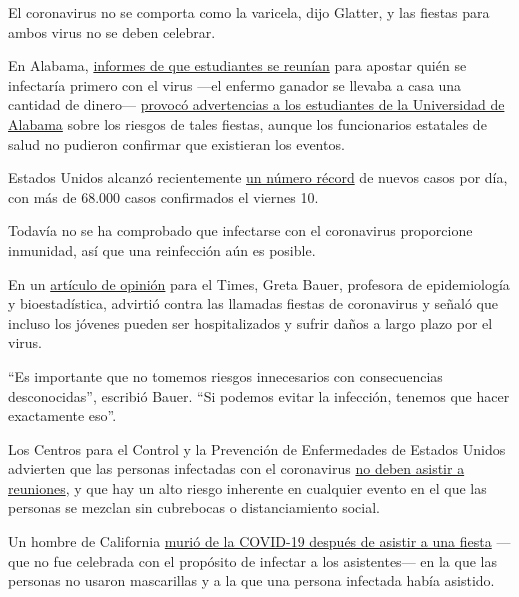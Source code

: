 El coronavirus no se comporta como la varicela, dijo Glatter, y las
fiestas para ambos virus no se deben celebrar.

En Alabama,
\href{https://www.wbrc.com/2020/07/03/covid-parties-tuscaloosa-whats-really-going/}{informes
de que estudiantes se reunían} para apostar quién se infectaría primero
con el virus ---el enfermo ganador se llevaba a casa una cantidad de
dinero---
\href{https://abc3340.com/news/local/university-of-alabama-responds-to-covid-parties-being-thrown-in-tuscaloosa}{provocó
advertencias a los estudiantes de la Universidad de Alabama} sobre los
riesgos de tales fiestas, aunque los funcionarios estatales de salud no
pudieron confirmar que existieran los eventos.

Estados Unidos alcanzó recientemente
\href{https://www.nytimes3xbfgragh.onion/es/interactive/2020/espanol/mundo/coronavirus-en-estados-unidos.html}{un
número récord} de nuevos casos por día, con más de 68.000 casos
confirmados el viernes 10.

Todavía no se ha comprobado que infectarse con el coronavirus
proporcione inmunidad, así que una reinfección aún es posible.

En un
\href{https://www.nytimes3xbfgragh.onion/2020/04/08/opinion/coronavirus-parties-herd-immunity.html}{artículo
de opinión} para el Times, Greta Bauer, profesora de epidemiología y
bioestadística, advirtió contra las llamadas fiestas de coronavirus y
señaló que incluso los jóvenes pueden ser hospitalizados y sufrir daños
a largo plazo por el virus.

``Es importante que no tomemos riesgos innecesarios con consecuencias
desconocidas'', escribió Bauer. ``Si podemos evitar la infección,
tenemos que hacer exactamente eso''.

Los Centros para el Control y la Prevención de Enfermedades de Estados
Unidos advierten que las personas infectadas con el coronavirus
\href{https://espanol.cdc.gov/coronavirus/2019-ncov/community/large-events/considerations-for-events-gatherings.html}{no
deben asistir a reuniones}, y que hay un alto riesgo inherente en
cualquier evento en el que las personas se mezclan sin cubrebocas o
distanciamiento social.

Un hombre de California
\href{https://www.washingtonpost.com/nation/2020/07/02/man-who-went-party-warned-people-not-be-an-idiot-like-me-day-before-dying-covid-19/}{murió
de la COVID-19 después de asistir a una fiesta} ---que no fue celebrada
con el propósito de infectar a los asistentes--- en la que las personas
no usaron mascarillas y a la que una persona infectada había asistido.

